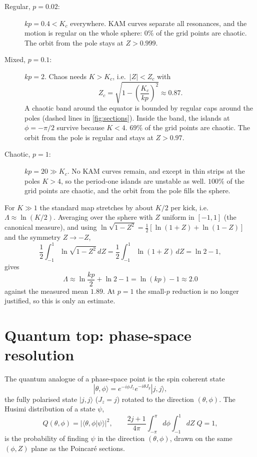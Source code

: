 \documentclass[11pt,a4paper]{article}
\begin{document}
\begin{description}
\item[Regular, $p=0.02$:] $kp=0.4<K_c$ everywhere. KAM curves separate all resonances, and the motion is regular on the
  whole sphere: $0\%$ of the grid points are chaotic. The orbit from the pole stays at $Z>0.999$.
\item[Mixed, $p=0.1$:] $kp=2$. Chaos needs $K>K_c$, i.e.\ $|Z|<Z_c$ with
  \begin{equation}\label{eq:Zc}
    Z_c = \sqrt{1-\left(\frac{K_c}{kp}\right)^2} \approx 0.87 .
  \end{equation}
  A chaotic band around the equator is bounded by regular caps around the poles (dashed lines in
  \cref{fig:sections}). Inside the band, the islands at $\phi=-\pi/2$ survive because $K<4$. $69\%$ of the grid
  points are chaotic. The orbit from the pole is regular and stays at $Z>0.97$.
\item[Chaotic, $p=1$:] $kp=20\gg K_c$. No KAM curves remain, and except in thin strips at the poles $K>4$, so the
  period-one islands are unstable as well. $100\%$ of the grid points are chaotic, and the orbit from the pole fills the
  sphere.
\end{description}
For $K\gg1$ the standard map stretches by about $K/2$ per kick, i.e.\ $\Lambda\approx\ln(K/2)$. Averaging over the
sphere with $Z$ uniform in $[-1,1]$ (the canonical measure), and using
$\ln\sqrt{1-Z^2}=\tfrac12[\ln(1+Z)+\ln(1-Z)]$ and the symmetry $Z\to-Z$,
\begin{equation}
  \frac12\int_{-1}^{1}\ln\sqrt{1-Z^2}\,dZ = \frac12\int_{-1}^{1}\ln(1+Z)\,dZ = \ln2-1,
\end{equation}
gives
\begin{equation}
  \Lambda \approx \ln\frac{kp}{2} + \ln2 - 1 = \ln(kp) - 1 \approx 2.0
\end{equation}
against the measured mean $1.89$. At $p=1$ the small-$p$ reduction is no longer justified, so this is only an
estimate.

\section{Quantum top: phase-space resolution}\label{sec:quantum}

The quantum analogue of a phase-space point is the spin coherent state
\begin{equation}
  |\theta,\phi\rangle = e^{-i\phi J_z}e^{-i\theta J_y}|j,j\rangle ,
\end{equation}
the fully polarised state $|j,j\rangle$ ($J_z=j$) rotated to the direction $(\theta,\phi)$. The Husimi distribution of
a state $\psi$,
\begin{equation}\label{eq:Q}
  Q(\theta,\phi) = |\langle\theta,\phi|\psi\rangle|^2 ,\qquad
  \frac{2j+1}{4\pi}\int_{-\pi}^{\pi}\!d\phi\int_{-1}^{1}\!dZ\;Q = 1,
\end{equation}
is the probability of finding $\psi$ in the direction $(\theta,\phi)$, drawn on the same $(\phi,Z)$ plane as the
Poincar\'e sections.
\end{document}
